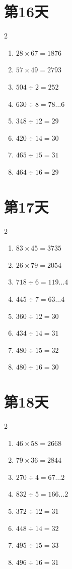 \documentclass[12pt]{ctexart}
\begin{document}
	\section*{第16天}
	\begin{multicols}{2}
		\begin{enumerate}[itemsep=0pt]
			\item $28 \times 67 = 1876$
			\item $57 \times 49 = 2793$
			\item $504 \div 2 = 252$
			\item $630 \div 8 = 78\ldots 6$
			\item $348 \div 12 = 29$
			\item $420 \div 14 = 30$
			\item $465 \div 15 = 31$
			\item $464 \div 16 = 29$
		\end{enumerate}
	\end{multicols}
	
	\section*{第17天}
	\begin{multicols}{2}
		\begin{enumerate}[itemsep=0pt]
			\item $83 \times 45 = 3735$
			\item $26 \times 79 = 2054$
			\item $718 \div 6 = 119\ldots 4$
			\item $445 \div 7 = 63\ldots 4$
			\item $360 \div 12 = 30$
			\item $434 \div 14 = 31$
			\item $480 \div 15 = 32$
			\item $480 \div 16 = 30$
		\end{enumerate}
	\end{multicols}
	
	\section*{第18天}
	\begin{multicols}{2}
		\begin{enumerate}[itemsep=0pt]
			\item $46 \times 58 = 2668$
			\item $79 \times 36 = 2844$
			\item $270 \div 4 = 67\ldots 2$
			\item $832 \div 5 = 166\ldots 2$
			\item $372 \div 12 = 31$
			\item $448 \div 14 = 32$
			\item $495 \div 15 = 33$
			\item $496 \div 16 = 31$
		\end{enumerate}
	\end{multicols}
	
\end{document}
